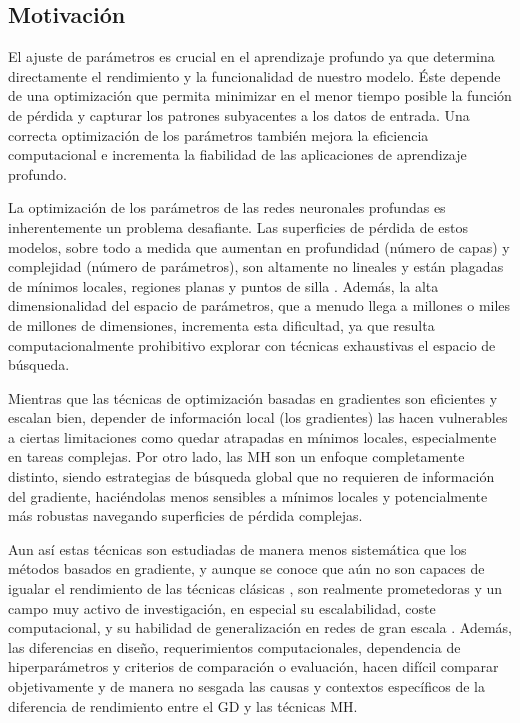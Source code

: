 \newpage



\subsection{Motivación}
\label{sec:motinfo}

El ajuste de parámetros es crucial en el aprendizaje profundo ya que determina directamente el rendimiento y la funcionalidad de nuestro modelo. Éste depende de una optimización que permita minimizar en el menor tiempo posible la función de pérdida y capturar los patrones subyacentes a los datos de entrada. Una correcta optimización de los parámetros también mejora la eficiencia computacional e incrementa la fiabilidad de las aplicaciones de aprendizaje profundo.


La optimización de los parámetros de las redes neuronales profundas es inherentemente un problema desafiante. Las superficies de pérdida de estos modelos, sobre todo a medida que aumentan en profundidad (número de capas) y complejidad (número de parámetros), son altamente no lineales y están plagadas de mínimos locales, regiones planas y puntos de silla \cite{NIPS2014_17e23e50}. Además, la alta dimensionalidad del espacio de parámetros, que a menudo llega a millones o miles de millones de dimensiones, incrementa esta dificultad, ya que resulta computacionalmente prohibitivo explorar con técnicas exhaustivas el espacio de búsqueda.

Mientras que las técnicas de optimización basadas en gradientes son eficientes y escalan bien, depender de información local (los gradientes) las hacen vulnerables a ciertas limitaciones como quedar atrapadas en mínimos locales, especialmente en tareas complejas. Por otro lado, las MH son un enfoque completamente distinto, siendo estrategias de búsqueda global que no requieren de información del gradiente, haciéndolas menos sensibles a mínimos locales y potencialmente más robustas navegando superficies de pérdida complejas. 

Aun así estas técnicas son estudiadas de manera menos sistemática que los métodos basados en gradiente, y aunque se conoce que aún no son capaces de igualar el rendimiento de las técnicas clásicas \cite{MHtrainingClase}, son realmente prometedoras y un campo muy activo de investigación, en especial su escalabilidad, coste computacional, y su habilidad de generalización en redes de gran escala \cite{MHtrainingClase}. Además, las diferencias en diseño, requerimientos computacionales, dependencia de hiperparámetros y criterios de comparación o evaluación, hacen difícil comparar objetivamente y de manera no sesgada las causas y contextos específicos de la diferencia de rendimiento entre el GD y las técnicas MH.


